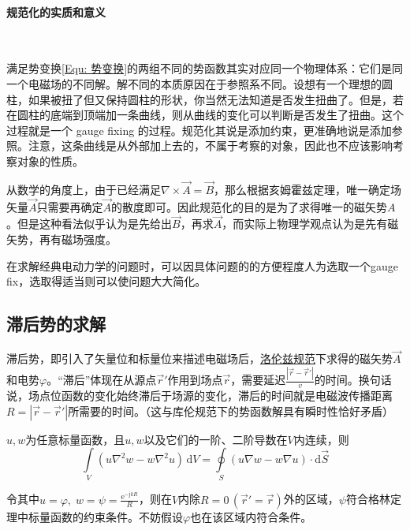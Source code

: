     \paragraph{规范化的实质和意义}
    ~\\ \vspace{-5pt}%
    
    满足势变换\eqref{Equ: 势变换}的两组不同的势函数其实对应同一个物理体系：它们是同一个电磁场的不同解。解不同的本质原因在于参照系不同。设想有一个理想的圆柱，如果被扭了但又保持圆柱的形状，你当然无法知道是否发生扭曲了。但是，若在圆柱的底端到顶端加一条曲线，则从曲线的变化可以判断是否发生了扭曲。这个过程就是一个 gauge fixing 的过程。规范化其说是添加约束，更准确地说是添加参照。注意，这条曲线是从外部加上去的，不属于考察的对象，因此也不应该影响考察对象的性质。

    {\color{gray}
        从数学的角度上，由于已经满足$\nabla\times\vec{A}=\vec{B}$，那么根据亥姆霍兹定理，唯一确定场矢量$\vec{A}$只需要再确定$\vec{A}$的散度即可。因此规范化的目的是为了求得唯一的磁矢势$A$。但是这种看法似乎认为是先给出$\vec{B}$，再求$\vec{A}$，而实际上物理学观点认为是先有磁矢势，再有磁场强度。
    }

    在求解经典电动力学的问题时，可以因具体问题的的方便程度人为选取一个gauge fix，选取得适当则可以使问题大大简化。


    \subsection{滞后势的求解}
    滞后势，即引入了矢量位和标量位来描述电磁场后，\underline{洛伦兹规范}下求得的磁矢势$\vec{A}$和电势$\varphi$。“滞后”体现在从源点$\vec{r}'$作用到场点$\vec{r}$，需要延迟$\frac{|\vec{r}-\vec{r}'|}{v}$的时间。换句话说，场点位函数的变化始终滞后于场源的变化，滞后的时间就是电磁波传播距离$R=|\vec{r}-\vec{r}'|$所需要的时间。（这与库伦规范下的势函数解具有瞬时性恰好矛盾）

    \begin{lemma}[格林定理]
        $u,w$为任意标量函数，且$u,w$以及它们的一阶、二阶导数在$V$内连续，则
        \begin{equation}
            \int\limits_V (u \nabla^2w-w \nabla^2u)\,\mathrm{d}V=\oint\limits_S (u \nabla w-w \nabla u)\cdot\mathrm{d}\vec{S}
        \end{equation}
    \end{lemma}

    令其中$u=\varphi,\;w=\psi=\frac{\mathrm{e}^{-\mathrm{j}k R}}{R}$，则在$V$内除$R=0\,(\vec{r}'=\vec{r})$外的区域，$\psi$符合格林定理中标量函数的约束条件。不妨假设$\varphi$也在该区域内符合条件。

